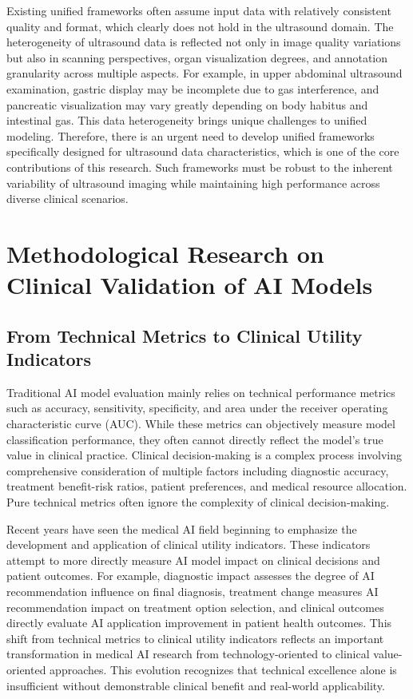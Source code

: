 Existing unified frameworks often assume input data with relatively consistent quality and format, which clearly does not hold in the ultrasound domain. The heterogeneity of ultrasound data is reflected not only in image quality variations but also in scanning perspectives, organ visualization degrees, and annotation granularity across multiple aspects. For example, in upper abdominal ultrasound examination, gastric display may be incomplete due to gas interference, and pancreatic visualization may vary greatly depending on body habitus and intestinal gas. This data heterogeneity brings unique challenges to unified modeling. Therefore, there is an urgent need to develop unified frameworks specifically designed for ultrasound data characteristics, which is one of the core contributions of this research. Such frameworks must be robust to the inherent variability of ultrasound imaging while maintaining high performance across diverse clinical scenarios.

\section{Methodological Research on Clinical Validation of AI Models}

\subsection{From Technical Metrics to Clinical Utility Indicators}

Traditional AI model evaluation mainly relies on technical performance metrics such as accuracy, sensitivity, specificity, and area under the receiver operating characteristic curve (AUC). While these metrics can objectively measure model classification performance, they often cannot directly reflect the model's true value in clinical practice. Clinical decision-making is a complex process involving comprehensive consideration of multiple factors including diagnostic accuracy, treatment benefit-risk ratios, patient preferences, and medical resource allocation. Pure technical metrics often ignore the complexity of clinical decision-making.

Recent years have seen the medical AI field beginning to emphasize the development and application of clinical utility indicators. These indicators attempt to more directly measure AI model impact on clinical decisions and patient outcomes. For example, diagnostic impact assesses the degree of AI recommendation influence on final diagnosis, treatment change measures AI recommendation impact on treatment option selection, and clinical outcomes directly evaluate AI application improvement in patient health outcomes. This shift from technical metrics to clinical utility indicators reflects an important transformation in medical AI research from technology-oriented to clinical value-oriented approaches. This evolution recognizes that technical excellence alone is insufficient without demonstrable clinical benefit and real-world applicability.

